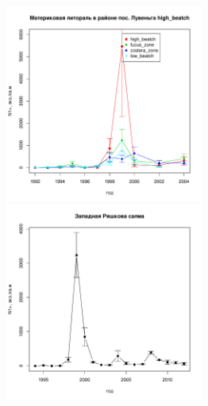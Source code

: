 \begin{figure}[h]
	\begin{minipage}[b]{.46\linewidth}
	\begin{center}
		\includegraphics[width=65mm]{../White_Sea/Luvenga_II_razrez/2razrez_N_oneyear.pdf}
	\end{center}
	\end{minipage}
%
	\hfil %
%
	\begin{minipage}[b]{.46\linewidth}
	\begin{center}
		\includegraphics[width=65mm]{../White_Sea/Ryashkov_ZRS/ZRS_N_oneyear.pdf}
	\end{center}
	\end{minipage}



\end{figure}
